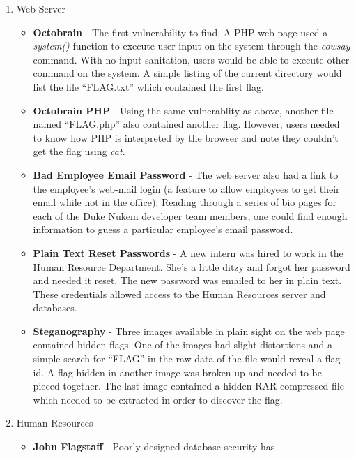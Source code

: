 \documentclass[10pt]{article}
\begin{document}
\begin{enumerate}
  \item Web Server
      \begin{itemize}
        \item \textbf{Octobrain} - The first vulnerability to find. A PHP web page
        used a \textit{system()} function to execute user input on the system
        through the \textit{cowsay} command. With no input sanitation, users
        would be able to execute other command on the system. A simple listing
        of the current directory would list the file ``FLAG.txt'' which
        contained the first flag.
        \item \textbf{Octobrain PHP} - Using the same vulnerablity as above, another
        file named ``FLAG.php'' also contained another flag. However, users
        needed to know how PHP is interpreted by the browser and note they
        couldn't get the flag using \textit{cat}.
        \item \textbf{Bad Employee Email Password} - The web server also had a
        link to the employee's web-mail login (a feature to allow employees to
        get their email while not in the office). Reading through a series of
        bio pages for each of the Duke Nukem developer team members, one could
        find enough information to guess a particular employee's email password.
        \item \textbf{Plain Text Reset Passwords} - A new intern was hired to
        work in the Human Resource Department. She's a little ditzy and forgot
        her password and needed it reset. The new password was emailed to her in
        plain text. These credentials allowed access to the Human Resources
        server and databases.
        \item \textbf{Steganography} - Three images available in plain sight on
        the web page contained hidden flags. One of the images had slight
        distortions and a simple search for ``FLAG'' in the raw data of the
        file would reveal a flag id. A flag hidden in another image was
        broken up and needed to be pieced together. The last image contained a
        hidden RAR compressed file which needed to be extracted in order to
        discover the flag.
      \end{itemize}
  \item Human Resources
      \begin{itemize}
        \item \textbf{John Flagstaff} - Poorly designed database security has

\end{itemize}
\end{enumerate}
\end{document}
